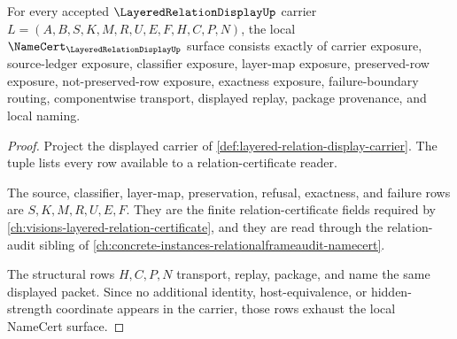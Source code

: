 \begin{theorem}
\label{thm:layered-relation-packet-namecert-surface}
For every accepted $\LayeredRelationDisplayUp$ carrier $L=(A,B,S,K,M,R,U,E,F,H,C,P,N)$, the local $\NameCert_{\LayeredRelationDisplayUp}$ surface consists exactly of carrier exposure, source-ledger exposure, classifier exposure, layer-map exposure, preserved-row exposure, not-preserved-row exposure, exactness exposure, failure-boundary routing, componentwise transport, displayed replay, package provenance, and local naming.
\end{theorem}
\begin{proof}
Project the displayed carrier of \autoref{def:layered-relation-display-carrier}. The tuple lists every row available to a relation-certificate reader.

The source, classifier, layer-map, preservation, refusal, exactness, and failure rows are $S,K,M,R,U,E,F$. They are the finite relation-certificate fields required by \autoref{ch:visions-layered-relation-certificate}, and they are read through the relation-audit sibling of \autoref{ch:concrete-instances-relationalframeaudit-namecert}.

The structural rows $H,C,P,N$ transport, replay, package, and name the same displayed packet. Since no additional identity, host-equivalence, or hidden-strength coordinate appears in the carrier, those rows exhaust the local NameCert surface.
\end{proof}

